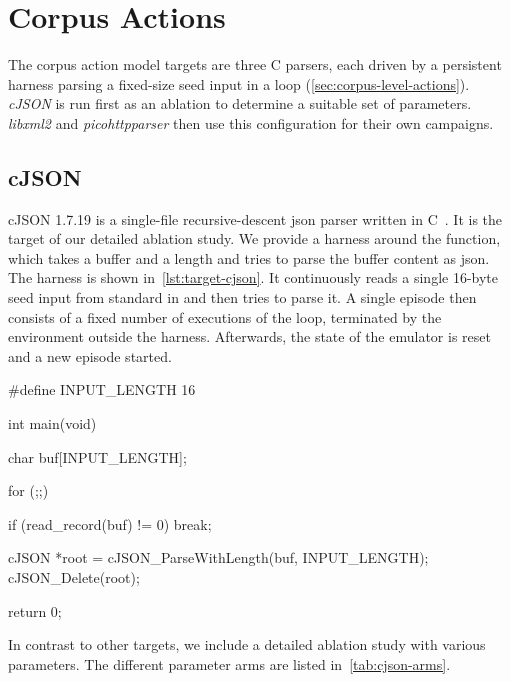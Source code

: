 
\section{Corpus Actions}\label{sec:targets-corpus-actions}

The corpus action model targets are three C parsers, each driven by a persistent
harness parsing a fixed-size seed input in a loop (\cref{sec:corpus-level-actions}).
\emph{cJSON} is run first as an ablation to determine a suitable set of parameters.
\emph{libxml2} and \emph{picohttpparser} then use this configuration for their own campaigns.

\subsection{cJSON}\label{sec:target-cjson}

cJSON 1.7.19 is a single-file recursive-descent \gls{json} parser written in C~\cite{gamble_cjson_nodate}.
It is the target of our detailed ablation study.
We provide a harness around the  function, which takes
a buffer and a length and tries to parse the buffer content as \gls{json}.
The harness is shown in~\cref{lst:target-cjson}.
It continuously reads a single 16-byte seed input from standard in and then
tries to parse it.
A single episode then consists of a fixed number of executions of the loop, terminated
by the environment outside the harness.
Afterwards, the state of the emulator is reset and a new episode started.

\begin{ccode}[float=htbp,
  caption={[The cJSON harness]%
    The persistent cJSON harness.
    \code{read\_record} reads a full 16-byte seed and then calls the cJSON parser.},
  label={lst:target-cjson}]
#define INPUT_LENGTH 16

int main(void) {
    char buf[INPUT_LENGTH];

    for (;;) {
        if (read_record(buf) != 0)
            break;

        cJSON *root = cJSON_ParseWithLength(buf, INPUT_LENGTH);
        cJSON_Delete(root);
    }

    return 0;
}
\end{ccode}

In contrast to other targets, we include a detailed ablation study with various parameters.
The different parameter arms are listed in~\cref{tab:cjson-arms}.


